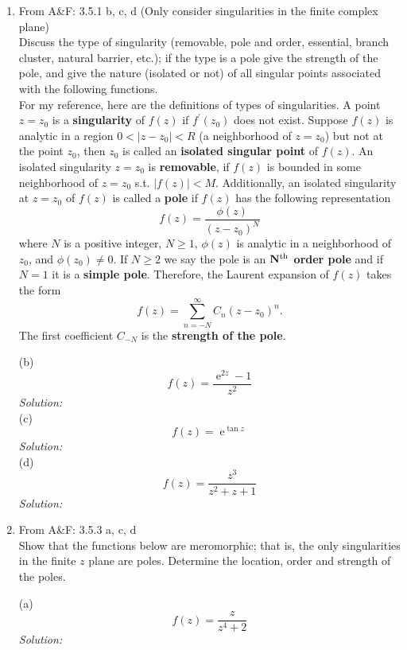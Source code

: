\documentclass[10pt]{amsart}
\DeclareMathOperator{\E}{e}
\theoremstyle{nonumberplain}
\begin{document}
\mline
\begin{enumerate}[label={\bf {\arabic*}:}]
\item  From A\&F: 3.5.1 b, c, d (Only consider singularities in the finite
  complex plane) \\
Discuss the type of singularity (removable, pole and order, essential, branch cluster, natural barrier, etc.); if the type is a pole give the strength of the pole,  and give the nature (isolated or not) of all singular points associated with the following functions. \\

\noindent
For my reference, here are the definitions of types of singularities.
A point $z=z_0$ is a {\bf singularity} of $f(z)$ if $f^\prime(z_0)$ does not exist.
Suppose $f(z)$ is analytic in a region $0 < |z - z_0| < R$ (a neighborhood of $z = z_0$) but not at the point $z_0$, then $z_0$ is called an {\bf isolated singular point} of $f(z)$.
An isolated singularity $z=z_0$ is {\bf removable}, if $f(z)$ is bounded in some neighborhood of $z=z_0$ s.t. $|f(z)| < M$.
Additionally, an isolated singularity at $z = z_0$ of $f(z)$ is called a {\bf pole} if $f(z)$ has the following representation
$$
f(z) = \frac {\phi (z)}{(z - z_0)^N}
$$
where $N$ is a positive integer, $N \geq 1$, $\phi(z)$ is analytic in a neighborhood of $z_0$, and $\phi(z_0) \neq 0$.
If $N \geq 2$ we say the pole is an {\bf ${\bf N}^{\rm th}$ order pole} and if $N = 1$ it is a {\bf simple pole}.
Therefore, the Laurent expansion of $f(z)$ takes the form
$$
f(z) = \sum_{n=-N}^\infty C_n(z - z_0)^n.
$$
The first coefficient $C_{-N}$ is the {\bf strength of the pole}.

\noindent
(b)
$$
f(z) = \frac {\E^{2z} - 1} {z^2}
$$
\textit{Solution:} \\

\noindent
(c)
$$
f(z) = \E^{\tan z}
$$
\textit{Solution:} \\

\noindent
(d)
$$
f(z) = \frac {z^3}{z^2 + z + 1}
$$
\textit{Solution:} \\
\newpage

\item From A\&F: 3.5.3 a, c, d \\
Show that the functions below are meromorphic; that is, the only singularities in the finite $z$ plane are poles.
Determine the location, order and strength of the poles. 

\noindent
(a)
$$
f(z) = \frac z {z^4 + 2}
$$
\textit{Solution:} \\


\end{enumerate}
\end{document}
